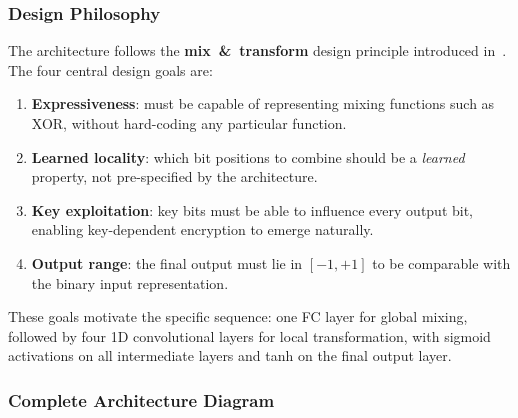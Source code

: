 \documentclass[12pt, a4paper]{article}
\begin{document}
\subsubsection*{Design Philosophy}

The architecture follows the \textbf{mix~\&~transform} design principle
introduced in~\cite{abadi2016learning}. The four central design goals are:

\begin{enumerate}[leftmargin=2em, itemsep=4pt]
  \item \textbf{Expressiveness}: must be capable of representing mixing
        functions such as XOR, without hard-coding any particular function.
  \item \textbf{Learned locality}: which bit positions to combine should
        be a \emph{learned} property, not pre-specified by the architecture.
  \item \textbf{Key exploitation}: key bits must be able to influence every
        output bit, enabling key-dependent encryption to emerge naturally.
  \item \textbf{Output range}: the final output must lie in $[-1,+1]$
        to be comparable with the binary input representation.
\end{enumerate}

These goals motivate the specific sequence: one FC layer for global
mixing, followed by four 1D convolutional layers for local transformation,
with sigmoid activations on all intermediate layers and tanh on the final
output layer.

\subsubsection*{Complete Architecture Diagram}
\end{document}
